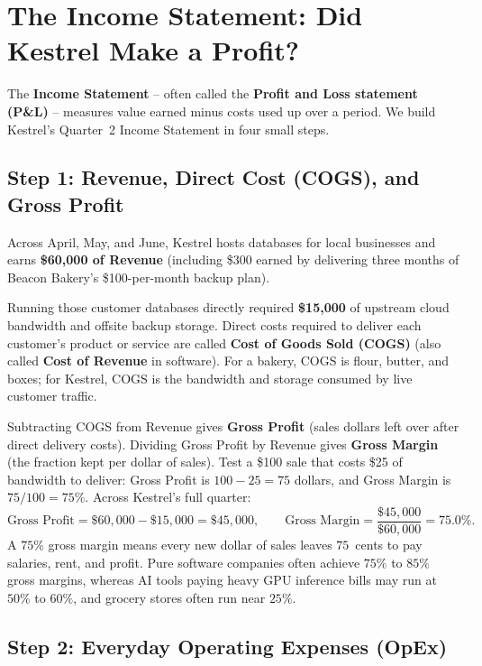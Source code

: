 \section{The Income Statement: Did Kestrel Make a Profit?}

The \textbf{Income Statement} -- often called the \textbf{Profit and Loss statement (P\&L)} -- measures value earned minus costs used up over a period. We build Kestrel's Quarter~2 Income Statement in four small steps.

\subsection*{Step 1: Revenue, Direct Cost (COGS), and Gross Profit}

Across April, May, and June, Kestrel hosts databases for local businesses and earns \textbf{\$60,000 of Revenue} (including \$300 earned by delivering three months of Beacon Bakery's \$100-per-month backup plan).

Running those customer databases directly required \textbf{\$15,000} of upstream cloud bandwidth and offsite backup storage. Direct costs required to deliver each customer's product or service are called \textbf{Cost of Goods Sold (COGS)} (also called \textbf{Cost of Revenue} in software). For a bakery, COGS is flour, butter, and boxes; for Kestrel, COGS is the bandwidth and storage consumed by live customer traffic.

Subtracting COGS from Revenue gives \textbf{Gross Profit} (sales dollars left over after direct delivery costs). Dividing Gross Profit by Revenue gives \textbf{Gross Margin} (the fraction kept per dollar of sales). Test a \$100 sale that costs \$25 of bandwidth to deliver: Gross Profit is $100 - 25 = 75$ dollars, and Gross Margin is $75 / 100 = 75\%$. Across Kestrel's full quarter:
\[
  \text{Gross Profit} = \$60{,}000 - \$15{,}000 = \$45{,}000, \qquad
  \text{Gross Margin} = \frac{\$45{,}000}{\$60{,}000} = 75.0\%.
\]
A $75\%$ gross margin means every new dollar of sales leaves $75$~cents to pay salaries, rent, and profit. Pure software companies often achieve $75\%$ to $85\%$ gross margins, whereas AI tools paying heavy GPU inference bills may run at $50\%$ to $60\%$, and grocery stores often run near $25\%$.

\subsection*{Step 2: Everyday Operating Expenses (OpEx)}

